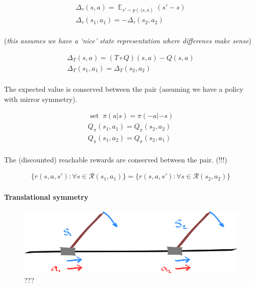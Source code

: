 \begin{align}
\Delta_{\tau}(s, a) = \mathop{\mathbb E}_{s' \sim p(\cdot| s, a)} (s' - s) \\
\Delta_{\tau}(s_1, a_1) = - \Delta_{\tau}(s_2, a_2) \\
\end{align}

(\emph{this assumes we have a `nice' state representation where
differenes make sense})

\begin{align}
\Delta_{T}(s, a) = (T \circ Q)(s,a) - Q(s,a)\\
\Delta_{T}(s_1, a_1) = \Delta_{T}(s_2, a_2) \\
\end{align}

The expected value is conserved between the pair (assuming we have a
policy with mirror symmetry).

\begin{align}
\text{ set}\;\;\pi(a | s) = \pi(-a| -s) \\
Q_\pi(s_1, a_1) = Q_\pi(s_2, a_2) \\
Q_\pi(s_1, a_2) = Q_\pi(s_2, a_1) \\
\end{align}

The (discounted) reachable rewards are conserved between the pair. (!!!)

\begin{align}
\{r(s, a, s'): \forall s \in \mathcal R(s_1, a_1)\} = \{r(s, a, s'): \forall s \in \mathcal R(s_2, a_2)\}
\end{align}


\hypertarget{translational-symmetry}{%
\paragraph{Translational symmetry}\label{translational-symmetry}}

\begin{figure}
\centering
\includegraphics[width=1\textwidth,height=0.25\textheight]{../../pictures/drawings/cart-pole-translation.png}
\caption{???}
\end{figure}

